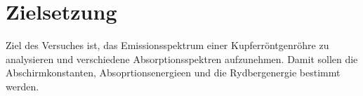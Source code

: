 \section{Zielsetzung}
\label{sec:zielsetzung}
Ziel des Versuches ist, das Emissionsspektrum einer Kupferröntgenröhre zu analysieren 
und verschiedene Absorptionsspektren aufzunehmen.
Damit sollen die Abschirmkonstanten, Absoprtionsenergieen und die Rydbergenergie bestimmt werden.
